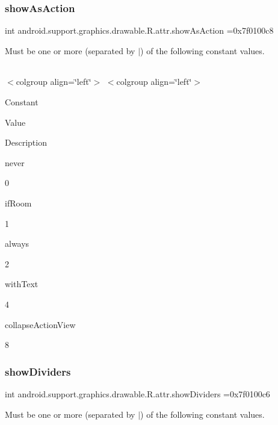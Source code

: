 \subsubsection{\texorpdfstring{show\+As\+Action}{showAsAction}}
{\footnotesize\ttfamily int android.\+support.\+graphics.\+drawable.\+R.\+attr.\+show\+As\+Action =0x7f0100c8\hspace{0.3cm}{\ttfamily [static]}}

Must be one or more (separated by \textquotesingle{}$\vert$\textquotesingle{}) of the following constant values.

\tabulinesep=1mm
\begin{longtabu} spread 0pt [c]{*{0}{|X[-1]}|}
\hline
\end{longtabu}
$<$colgroup align=\char`\"{}left\char`\"{}$>$ $<$colgroup align=\char`\"{}left\char`\"{}$>$ 

Constant

Value

Description 

{\ttfamily never}

0

{\ttfamily if\+Room}

1

{\ttfamily always}

2

{\ttfamily with\+Text}

4

{\ttfamily collapse\+Action\+View}

8\mbox{\label{classandroid_1_1support_1_1graphics_1_1drawable_1_1R_1_1attr_a319d898a91de1f1ef8f7ff796da4245f}} 
\subsubsection{\texorpdfstring{show\+Dividers}{showDividers}}
{\footnotesize\ttfamily int android.\+support.\+graphics.\+drawable.\+R.\+attr.\+show\+Dividers =0x7f0100c6\hspace{0.3cm}{\ttfamily [static]}}

Must be one or more (separated by \textquotesingle{}$\vert$\textquotesingle{}) of the following constant values.

